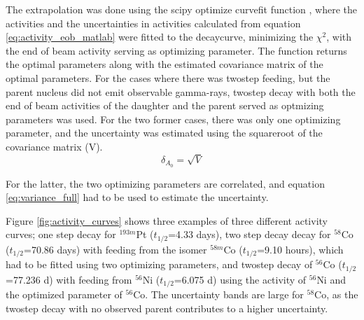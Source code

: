 \noindent The extrapolation was done using the scipy optimize curvefit function \cite{Virtanen2020}, where the activities and the uncertainties in activities calculated from equation \ref{eq:activity_eob_matlab} were fitted to the decaycurve, minimizing the $\chi^2$, with the end of beam activity serving as optimizing parameter. The function returns the optimal parameters along with the estimated covariance matrix of the optimal parameters. For the cases where there was twostep feeding, but the parent nucleus did not emit observable gamma-rays, twostep decay with both the end of beam activities of the daughter and the parent served as optmizing parameters was used. For the two former cases, there was only one optimizing parameter, and the uncertainty was estimated using the squareroot of the covariance matrix (V). 
\begin{equation}
    \delta_{A_0}=\sqrt{{V}}
\end{equation}

For the latter, the two optimizing parameters are correlated, and equation \ref{eq:variance_full} had to be used to estimate the uncertainty. 



\noindent 
Figure \ref{fig:activity_curves} shows three examples of three different activity curves; one step decay for $^{193m}$Pt ($t_{1/2}$=4.33 days), two step decay decay for $^{58}$Co ($t_{1/2}$=70.86 days) with feeding from the isomer $^{58m}$Co ($t_{1/2}$=9.10 hours), which had to be fitted using two optimizing parameters, and twostep decay of $^{56}$Co ($t_{1/2}$=77.236 d) with feeding from $^{56}$Ni ($t_{1/2}$=6.075 d) using the activity of $^{56}$Ni and the optimized parameter of $^{56}$Co. The uncertainty bands are large for $^{58}$Co, as the twostep decay with no observed parent contributes to a higher uncertainty.


